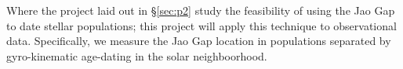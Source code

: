 Where the project laid out in \S \ref{sec:p2} study the feasibility of using the
Jao Gap to date stellar populations; this project will apply this technique to
observational data. Specifically, we measure the Jao Gap location in populations
separated by gyro-kinematic age-dating in the solar neighboorhood.
